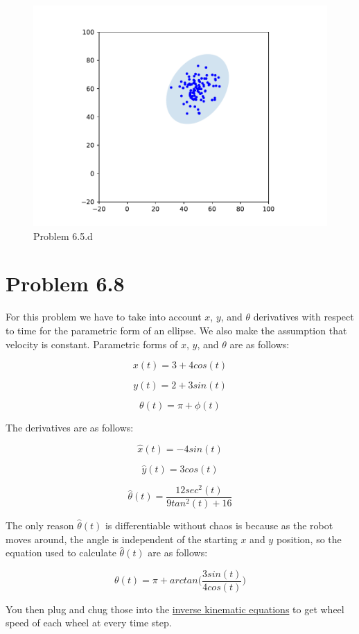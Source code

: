 \documentclass{article}
\begin{document}
\begin{figure}[h]
    \centering
    \includegraphics[pages=1]{p6-5-d}
    \caption{Problem 6.5.d}
    \label{fig:6.5.d}
\end{figure}


\newpage
\section{\textbf{Problem 6.8}}
For this problem we have to take into account $x$, $y$, and $\theta$ derivatives with respect to time for the parametric form of an ellipse. We also make the assumption that velocity is constant. Parametric forms of $x$, $y$, and $\theta$ are as follows:

$$x(t) = 3 + 4cos(t)$$

$$y(t) = 2 + 3sin(t)$$

$$\theta(t) = \pi + \phi(t)$$

The derivatives are as follows:

$$\hat{x}(t) = -4sin(t)$$

$$\hat{y}(t) = 3cos(t)$$

$$\hat{\theta}(t) = \frac{12sec^2(t)}{9tan^2(t) + 16}$$

The only reason $\hat{\theta}(t)$ is differentiable without chaos is because as the robot moves around, the angle is independent of the starting $x$ and $y$ position, so the equation used to calculate $\hat{\theta}(t)$ are as follows:

$$\theta(t) = \pi + arctan\Big(\frac{3sin(t)}{4cos(t)}\Big)$$

You then plug and chug those into the \href{http://roboscience.org/book/html/Motion/DriveSystems.html#equation-meccanuminversekinematics}{inverse kinematic equations} to get wheel speed of each wheel at every time step.
\end{document}
